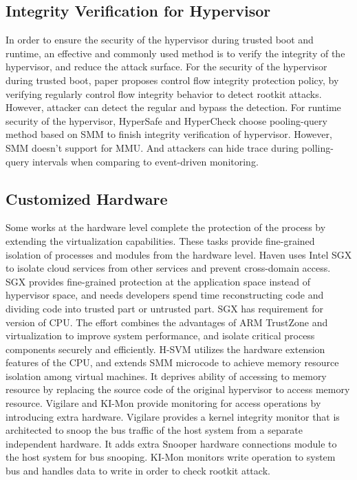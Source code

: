 \documentclass[conference]{IEEEtran}
\begin{document}
\subsection{Integrity Verification for Hypervisor}
In order to ensure the security of the hypervisor during trusted boot and runtime, an effective and commonly used method is to verify the integrity of the hypervisor, and reduce the attack surface. For the security of the hypervisor during trusted boot, paper \cite{Petroni2007Automated} proposes control flow integrity protection policy, by verifying regularly control flow integrity behavior to detect rootkit attacks. However, attacker can detect the regular and bypass the detection. For runtime security of the hypervisor, HyperSafe \cite{Wang2010HyperSafe} and HyperCheck \cite{Wang2010HyperCheck} choose pooling-query method based on SMM to finish integrity verification of hypervisor. However, SMM doesn't support for MMU. And attackers can hide trace during polling-query intervals when comparing to event-driven monitoring.


\subsection{Customized Hardware }
Some works at the hardware level complete the protection of the process by extending the virtualization capabilities. These tasks provide fine-grained isolation of processes and modules from the hardware level. Haven \cite{haven} uses Intel SGX\cite{Hoekstra13cuvillo,Mckeen2013Innovative} to isolate cloud services from other services and prevent cross-domain access. SGX provides fine-grained protection at the application space instead of hypervisor space, and needs developers spend time reconstructing code and dividing code into trusted part or untrusted part. SGX has requirement for version of CPU. The effort \cite{Cho2016Hardware} combines the advantages of ARM TrustZone and virtualization to improve system performance, and isolate critical process components securely and efficiently. H-SVM\cite{Jin2015H} utilizes the hardware extension features of the CPU, and extends SMM microcode to achieve memory resource isolation among virtual machines. It deprives ability of accessing to memory resource by replacing the source code of the original hypervisor to access memory resource. Vigilare\cite{Moon2012Vigilare} and KI-Mon \cite{Lee2013KI} provide monitoring for access operations by introducing extra hardware. Vigilare provides a kernel integrity monitor that is architected to snoop the bus traffic of the host system from a separate independent hardware. It adds extra Snooper hardware connections module to the host system for bus snooping. KI-Mon monitors write operation to system bus and handles data to write in order to check rootkit attack.
\end{document}
